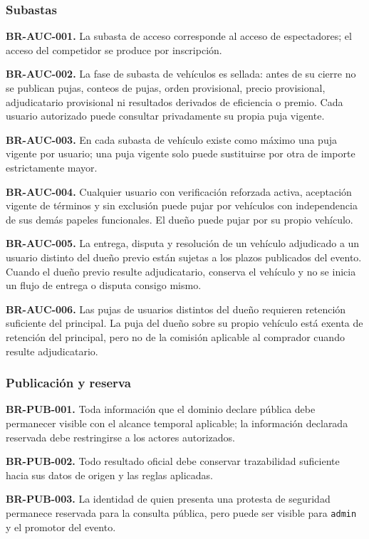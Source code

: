 \documentclass[10pt,letterpaper]{article}
\begin{document}
\subsubsection{Subastas}
\noindent\textbf{BR-AUC-001.} La subasta de acceso corresponde al acceso de espectadores; el acceso del competidor se produce por inscripción.\par
\noindent\textbf{BR-AUC-002.} La fase de subasta de vehículos es sellada: antes de su cierre no se publican pujas, conteos de pujas, orden provisional, precio provisional, adjudicatario provisional ni resultados derivados de eficiencia o premio. Cada usuario autorizado puede consultar privadamente su propia puja vigente.\par
\noindent\textbf{BR-AUC-003.} En cada subasta de vehículo existe como máximo una puja vigente por usuario; una puja vigente solo puede sustituirse por otra de importe estrictamente mayor.\par
\noindent\textbf{BR-AUC-004.} Cualquier usuario con verificación reforzada activa, aceptación vigente de términos y sin exclusión puede pujar por vehículos con independencia de sus demás papeles funcionales. El dueño puede pujar por su propio vehículo.\par
\noindent\textbf{BR-AUC-005.} La entrega, disputa y resolución de un vehículo adjudicado a un usuario distinto del dueño previo están sujetas a los plazos publicados del evento. Cuando el dueño previo resulte adjudicatario, conserva el vehículo y no se inicia un flujo de entrega o disputa consigo mismo.\par
\noindent\textbf{BR-AUC-006.} Las pujas de usuarios distintos del dueño requieren retención suficiente del principal. La puja del dueño sobre su propio vehículo está exenta de retención del principal, pero no de la comisión aplicable al comprador cuando resulte adjudicatario.\par
\subsubsection{Publicación y reserva}
\noindent\textbf{BR-PUB-001.} Toda información que el dominio declare pública debe permanecer visible con el alcance temporal aplicable; la información declarada reservada debe restringirse a los actores autorizados.\par
\noindent\textbf{BR-PUB-002.} Todo resultado oficial debe conservar trazabilidad suficiente hacia sus datos de origen y las reglas aplicadas.\par
\noindent\textbf{BR-PUB-003.} La identidad de quien presenta una protesta de seguridad permanece reservada para la consulta pública, pero puede ser visible para \texttt{admin} y el promotor del evento.\par
\end{document}
